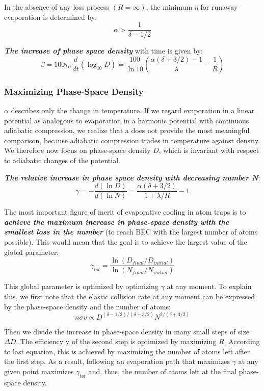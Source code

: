 \documentclass[12]{article}
\begin{document}
In the absence of any loss process $( R = \infty)$, the minimum $\eta$ for runaway evaporation is determined by: $$\alpha>\frac{1}{\delta-1 / 2}$$

\textbf{\textit{The increase of phase space density}} with time is given by:$$
\beta=100 \tau_{\mathrm{el}} \frac{d}{d t}\left(\log _{10} D\right)=\frac{100}{\ln 10}\left(\frac{\alpha(\delta+3 / 2)-1}{\lambda}-\frac{1}{R}\right)$$

\subsubsection{Maximizing Phase-Space Density}
$\alpha$ describes only the change in temperature. If we regard evaporation in a linear potential as analogous to evaporation in a harmonic potential with continuous adiabatic compression, we realize that a does not provide the most meaningful comparison, because adiabatic compression trades in temperature against density. We therefore now focus on phase-space density $D$, which is invariant with respect to adiabatic changes of the potential.

\textit{\textbf{The relative increase in phase space density with decreasing number N}}:$$
\gamma=-\frac{d(\ln D)}{d(\ln N)}=\frac{\alpha(\delta+3 / 2)}{1+\lambda / R}-1$$

The most important figure of merit of evaporative cooling in atom traps is to \textbf{\textit{achieve the maximum increase in phase-space density with the smallest loss in the number}} (to reach BEC with the largest number of atoms possible). This would mean that the goal is to achieve the largest value of the global parameter:$$\gamma_{tot}=\frac{\ln \left(D_{final} / D_{initial}\right)}{\ln \left(N_{final} / N_ {initial}\right)}$$

This global parameter is optimized by optimizing $\gamma$ at any moment. To explain this, we first note that the elastic collision rate at any moment can be expressed by the phase-space density and the number of atoms:$$n \sigma v \propto D^{(\delta-1 / 2) /(\delta+3 / 2)} N^{2 /(\delta+3 / 2)}$$

Then we divide the increase in phase-space density in many small steps of size $\Delta D$. The efficiency y of the second step is optimized by maximizing $R$. According to last equation, this is achieved by maximizing the number of atoms left after the first step. As a result, following an evaporation path that maximizes $\gamma$ at any given point maximizes $\gamma_{tot}$ and, thus, the number of atoms left at the final phase-space density.
\end{document}

